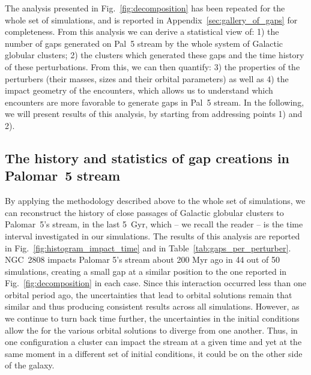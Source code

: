 \documentclass{aa}
\begin{document}
    The analysis presented in Fig.~\ref{fig:decomposition} has been repeated for the whole set of simulations, and is reported in Appendix~\ref{sec:gallery_of_gaps} for completeness. From this analysis we can derive a statistical view of: 1) the number of gaps generated on Pal~5 stream by the whole system of Galactic globular clusters; 2) the clusters which generated these gaps and the time history of these perturbations. From this, we can then quantify: 3) the properties of the perturbers (their masses, sizes and their orbital parameters) as well as 4) the impact geometry of the encounters, which allows us to understand which encounters are more favorable to generate gaps in Pal~5 stream. In the following, we will present results of this analysis, by starting from addressing points 1) and 2).





  \subsection{The history and statistics of gap creations in Palomar~5 stream}\label{sect:history}
  

      


    By applying the methodology described above to the whole set of simulations, we can reconstruct the history of close passages of Galactic globular clusters to Palomar~5's stream, in the last 5~Gyr, which -- we recall the reader -- is the time interval investigated in our simulations. The results of this analysis are reported in Fig.~\ref{fig:histogram_impact_time} and in Table~\ref{tab:gaps_per_perturber}. NGC~2808 impacts Palomar 5's stream about 200 Myr ago in 44 out of 50 simulations, creating a small gap at a similar position to the one reported in Fig.~\ref{fig:decomposition} in each case. Since this interaction occurred less than one orbital period ago, the uncertainties that lead to orbital solutions remain that similar and thus producing consistent results across all simulations. However, as we continue to turn back time further, the uncertainties in the initial conditions allow the for the various orbital solutions to diverge from one another. Thus, in one configuration a cluster can impact the stream at a given time and yet at the same moment in a different set of initial conditions, it could be on the other side of the galaxy.
    
\end{document}

